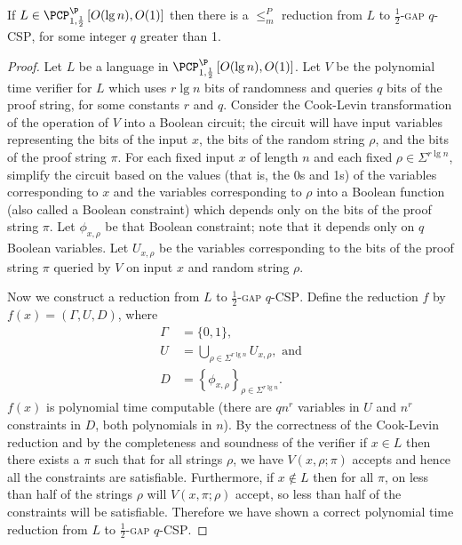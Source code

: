 \documentclass[]{article}
\newcommand{\PCPcs}[5]{\PCP^{#1}_{#2, #3}\left[#4, #5\right]}
\begin{document}
\begin{lemma}\label{lem:constraintsp}
  If $L \in \PCPcs{\P}{1}{\frac{1}{2}}{O(\lg n)}{O(1)}$ then there is a $\leq_m^P$ reduction from $L$ to \textsc{$\frac{1}{2}$-gap $q$-CSP}, for some integer $q$ greater than 1.
\end{lemma}
\begin{proof}
  Let $L$ be a language in $\PCPcs{\P}{1}{\frac{1}{2}}{O(\lg n)}{O(1)}$.
  Let $V$ be the polynomial time \PCP{} verifier for $L$ which uses $r \lg n$ bits of randomness and queries $q$ bits of the proof string, for some constants $r$ and $q$.
  Consider the Cook-Levin transformation of the operation of $V$ into a Boolean circuit; the circuit will have input variables representing the bits of the input $x$, the bits of the random string $\rho$, and the bits of the proof string $\pi$.
  For each fixed input $x$ of length $n$ and each fixed $\rho \in \Sigma^{r \lg n}$, simplify the circuit based on the values (that is, the 0s and 1s) of the variables corresponding to $x$ and the variables corresponding to $\rho$ into a Boolean function (also called a Boolean constraint) which depends only on the bits of the proof string $\pi$.
  Let $\phi_{x, \rho}$ be that Boolean constraint; note that it depends only on $q$ Boolean variables.
  Let $U_{x, \rho}$ be the variables corresponding to the bits of the proof string $\pi$ queried by $V$ on input $x$ and random string $\rho$.

  Now we construct a reduction from $L$ to \textsc{$\frac{1}{2}$-gap $q$-CSP}.
  Define the reduction $f$ by $f(x) = (\Gamma, U, D)$, where
  \begin{align*}
    \Gamma & = \{0, 1\}, \\
    U & = \bigcup_{\rho \in \Sigma^{r \lg n}}{U_{x, \rho}}, \text{ and} \\
    D & = \left\{\phi_{x, \rho}\right\}_{\rho \in \Sigma^{r \lg n}}.
  \end{align*}
  $f(x)$ is polynomial time computable (there are $qn^r$ variables in $U$ and $n^r$ constraints in $D$, both polynomials in $n$).
  By the correctness of the Cook-Levin reduction and by the completeness and soundness of the \PCP{} verifier if $x \in L$ then there exists a $\pi$ such that for all strings $\rho$, we have $V(x, \rho; \pi)$ accepts and hence all the constraints are satisfiable.
  Furthermore, if $x \notin L$ then for all $\pi$, on less than half of the strings $\rho$ will $V(x, \pi; \rho)$ accept, so less than half of the constraints will be satisfiable.
  Therefore we have shown a correct polynomial time reduction from $L$ to \textsc{$\frac{1}{2}$-gap $q$-CSP}.
\end{proof}
\end{document}
